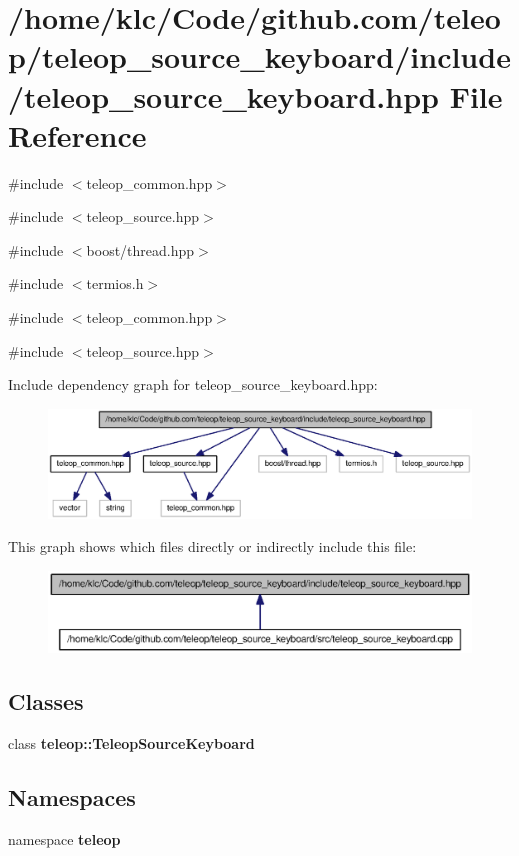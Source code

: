 \section{/home/klc/Code/github.com/teleop/teleop\_\-source\_\-keyboard/include/teleop\_\-source\_\-keyboard.hpp File Reference}
\label{teleop__source__keyboard_8hpp}
{\ttfamily \#include $<$teleop\_\-common.hpp$>$}\par
{\ttfamily \#include $<$teleop\_\-source.hpp$>$}\par
{\ttfamily \#include $<$boost/thread.hpp$>$}\par
{\ttfamily \#include $<$termios.h$>$}\par
{\ttfamily \#include $<$teleop\_\-common.hpp$>$}\par
{\ttfamily \#include $<$teleop\_\-source.hpp$>$}\par
Include dependency graph for teleop\_\-source\_\-keyboard.hpp:
\nopagebreak
\begin{figure}[H]
\begin{center}
\leavevmode
\includegraphics[width=400pt]{teleop__source__keyboard_8hpp__incl}
\end{center}
\end{figure}
This graph shows which files directly or indirectly include this file:
\nopagebreak
\begin{figure}[H]
\begin{center}
\leavevmode
\includegraphics[width=400pt]{teleop__source__keyboard_8hpp__dep__incl}
\end{center}
\end{figure}
\subsection*{Classes}
\begin{DoxyCompactItemize}
\item 
class {\bf teleop::TeleopSourceKeyboard}
\end{DoxyCompactItemize}
\subsection*{Namespaces}
\begin{DoxyCompactItemize}
\item 
namespace {\bf teleop}
\end{DoxyCompactItemize}
